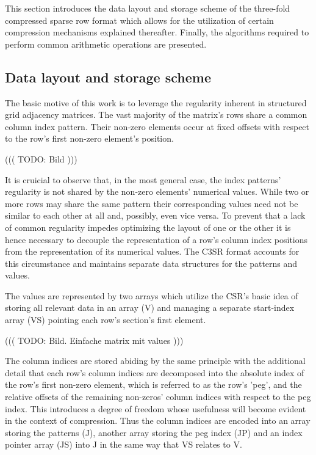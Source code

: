 \documentclass{article}
\begin{document}
  This section introduces the data layout and storage scheme of the three-fold compressed sparse row format which allows
  for the utilization of certain compression mechanisms explained thereafter. Finally, the algorithms required to
  perform common arithmetic operations are presented.

  \subsection{Data layout and storage scheme}

    The basic motive of this work is to leverage the regularity inherent in structured grid adjacency matrices. The vast
    majority of the matrix's rows share a common column index pattern. Their non-zero elements occur at fixed offsets
    with respect to the row's first non-zero element's position.

      ((( TODO: Bild )))

    It is cruicial to observe that, in the most general case, the index patterns' regularity is not shared by the
    non-zero elements' numerical values. While two or more rows may share the same pattern their corresponding values
    need not be similar to each other at all and, possibly, even vice versa. To prevent that a lack of common regularity
    impedes optimizing the layout of one or the other it is hence necessary to decouple the representation of a row's
    column index positions from the representation of its numerical values. The C3SR format accounts for this
    circumstance and maintains separate data structures for the patterns and values.

    The values are represented by two arrays which utilize the CSR's basic idea of storing all relevant data in an
    array (V) and managing a separate start-index array (VS) pointing each row's section's first element.

      ((( TODO: Bild. Einfache matrix mit values )))

    The column indices are stored abiding by the same principle with the additional detail that each row's column
    indices are decomposed into the absolute index of the row's first non-zero element, which is referred to as the
    row's 'peg', and the relative offsets of the remaining non-zeros' column indices with respect to the peg index.
    This introduces a degree of freedom whose usefulness will become evident in the context of compression. Thus the
    column indices are encoded into an array storing the patterns (J), another array storing the peg index (JP)
    and an index pointer array (JS) into J in the same way that VS relates to V.
\end{document}
